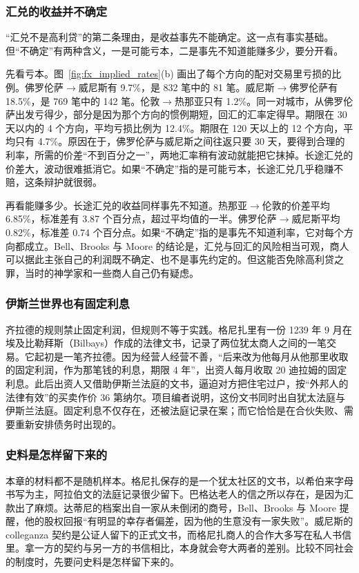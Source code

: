 \subsubsection{汇兑的收益并不确定}
“汇兑不是高利贷”的第二条理由，是收益事先不能确定。这一点有事实基础。但“不确定”有两种含义，一是可能亏本，二是事先不知道能赚多少，要分开看。

先看亏本。图~\ref{fig:fx_implied_rates}(b) 画出了每个方向的配对交易里亏损的比例。佛罗伦萨$\to$威尼斯有 9.7\%，是 832 笔中的 81 笔。威尼斯$\to$佛罗伦萨有 18.5\%，是 769 笔中的 142 笔。伦敦$\to$热那亚只有 1.2\%。同一对城市，从佛罗伦萨出发亏得少，部分是因为那个方向的惯例期短，回汇的汇率定得早。期限在 30 天以内的 4 个方向，平均亏损比例为 12.4\%。期限在 120 天以上的 12 个方向，平均只有 4.7\%。原因在于，佛罗伦萨与威尼斯之间往返只要 30 天，要得到合理的利率，所需的价差“不到百分之一”\cite{bell2017}，两地汇率稍有波动就能把它抹掉。长途汇兑的价差大，波动很难抵消它。如果“不确定”指的是可能亏本，长途汇兑几乎稳赚不赔，这条辩护就很弱。

再看能赚多少。长途汇兑的收益同样事先不知道。热那亚$\to$伦敦的价差平均 6.85\%，标准差有 3.87 个百分点，超过平均值的一半。佛罗伦萨$\to$威尼斯平均 0.82\%，标准差 0.74 个百分点\cite{bell2017}。如果“不确定”指的是事先不知道利率，它对每个方向都成立。Bell、Brooks 与 Moore 的结论是，汇兑与回汇的风险相当可观，商人可以据此主张自己的利润既不确定、也不是事先约定的。但这能否免除高利贷之罪，当时的神学家和一些商人自己仍有疑虑\cite{bell2017}。

\subsubsection{伊斯兰世界也有固定利息}
齐拉德的规则禁止固定利润，但规则不等于实践。格尼扎里有一份 1239 年 9 月在埃及比勒拜斯（Bilbays）作成的法律文书，记录了两位犹太商人之间的一笔交易。它起初是一笔齐拉德。因为经营人经营不善，“后来改为他每月从他那里收取的固定利润，作为那笔钱的利息，期限 4 年”，出资人每月收取 20 迪拉姆的固定利息。此后出资人又借助伊斯兰法庭的文书，逼迫对方把住宅过户，按“外邦人的法律有效”的买卖作价 36 第纳尔\cite{pgp2367}。项目编者说明，这份文书同时出自犹太法庭与伊斯兰法庭。固定利息不仅存在，还被法庭记录在案；而它恰恰是在合伙失败、需要重新安排债务时出现的。

\subsubsection{史料是怎样留下来的}
本章的材料都不是随机样本。格尼扎保存的是一个犹太社区的文书，以希伯来字母书写为主，阿拉伯文的法庭记录很少留下。巴格达老人的信之所以存在，是因为汇款出了麻烦。达蒂尼的档案出自一家从未倒闭的商号，Bell、Brooks 与 Moore 提醒，他的股权回报“有明显的幸存者偏差，因为他的生意没有一家失败”\cite{bell2017}。威尼斯的 colleganza 契约是公证人留下的正式文书，而格尼扎商人的合作大多写在私人书信里。拿一方的契约与另一方的书信相比，本身就会夸大两者的差别。比较不同社会的制度时，先要问史料是怎样留下来的。

